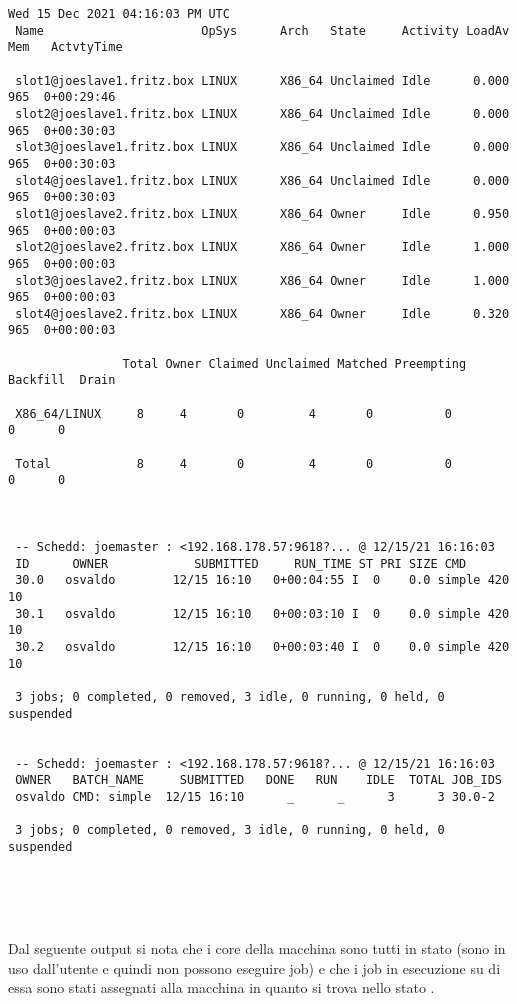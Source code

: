 \begin{lstlisting}[style=output_tiny]
 Wed 15 Dec 2021 04:16:03 PM UTC
 Name                      OpSys      Arch   State     Activity LoadAv Mem   ActvtyTime
 
 slot1@joeslave1.fritz.box LINUX      X86_64 Unclaimed Idle      0.000  965  0+00:29:46
 slot2@joeslave1.fritz.box LINUX      X86_64 Unclaimed Idle      0.000  965  0+00:30:03
 slot3@joeslave1.fritz.box LINUX      X86_64 Unclaimed Idle      0.000  965  0+00:30:03
 slot4@joeslave1.fritz.box LINUX      X86_64 Unclaimed Idle      0.000  965  0+00:30:03
 slot1@joeslave2.fritz.box LINUX      X86_64 Owner     Idle      0.950  965  0+00:00:03
 slot2@joeslave2.fritz.box LINUX      X86_64 Owner     Idle      1.000  965  0+00:00:03
 slot3@joeslave2.fritz.box LINUX      X86_64 Owner     Idle      1.000  965  0+00:00:03
 slot4@joeslave2.fritz.box LINUX      X86_64 Owner     Idle      0.320  965  0+00:00:03
 
                Total Owner Claimed Unclaimed Matched Preempting Backfill  Drain
 
 X86_64/LINUX     8     4       0         4       0          0        0      0
 
 Total            8     4       0         4       0          0        0      0
 
 
 
 -- Schedd: joemaster : <192.168.178.57:9618?... @ 12/15/21 16:16:03
 ID      OWNER            SUBMITTED     RUN_TIME ST PRI SIZE CMD
 30.0   osvaldo        12/15 16:10   0+00:04:55 I  0    0.0 simple 420 10
 30.1   osvaldo        12/15 16:10   0+00:03:10 I  0    0.0 simple 420 10
 30.2   osvaldo        12/15 16:10   0+00:03:40 I  0    0.0 simple 420 10
 
 3 jobs; 0 completed, 0 removed, 3 idle, 0 running, 0 held, 0 suspended
 
 
 -- Schedd: joemaster : <192.168.178.57:9618?... @ 12/15/21 16:16:03
 OWNER   BATCH_NAME     SUBMITTED   DONE   RUN    IDLE  TOTAL JOB_IDS
 osvaldo CMD: simple  12/15 16:10      _      _      3      3 30.0-2
 
 3 jobs; 0 completed, 0 removed, 3 idle, 0 running, 0 held, 0 suspended
 
 
 
\end{lstlisting}
\ \\
Dal seguente output si nota che i core della macchina  sono tutti in stato  (sono in uso dall'utente e quindi non possono eseguire job) e che i job in esecuzione su di essa sono stati assegnati alla macchina  in quanto si trova nello stato .

